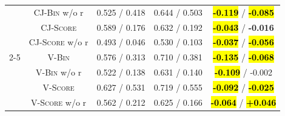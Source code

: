 \begin{table}[t]
\begin{tabular}{@{}c|c|ccc@{}}
         & \textsc{CJ-Bin} w/o r   & 0.525 / 0.418   & 0.644 / 0.503   & \hl{\textbf{-0.119}} / \hl{\textbf{-0.085}} \\
         & \textsc{CJ-Score}       & 0.589 / 0.176   & 0.632 / 0.192   & \hl{\textbf{-0.043}} / \textbf{-0.016} \\
         & \textsc{CJ-Score} w/o r & 0.493 / 0.046   & 0.530 / 0.103   & \hl{\textbf{-0.037}} / \hl{\textbf{-0.056}} \\
        \cmidrule{2-5}
         & \textsc{V-Bin}          & 0.576 / 0.313   & 0.710 / 0.381   & \hl{\textbf{-0.135}} / \hl{\textbf{-0.068}} \\
         & \textsc{V-Bin} w/o r    & 0.522 / 0.138   & 0.631 / 0.140   & \hl{\textbf{-0.109}} / -0.002 \\
         & \textsc{V-Score}        & 0.627 / 0.531   & 0.719 / 0.555   & \hl{\textbf{-0.092}} / \hl{\textbf{-0.025}} \\
         & \textsc{V-Score} w/o r  & 0.562 / 0.212   & 0.625 / 0.166   & \hl{\textbf{-0.064}} / \hl{\textbf{+0.046}} \\
        \bottomrule
    \end{tabular}
    \vspace{-10pt}
\end{table}